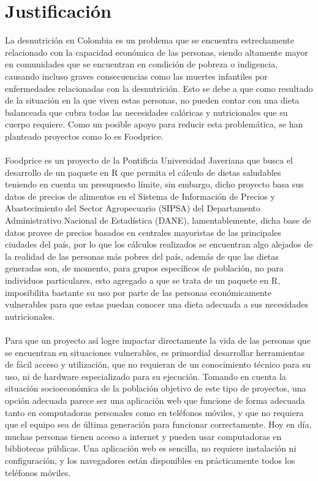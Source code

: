 \section{Justificaci\'on}
\noindent La desnutrici\'on en Colombia es un problema que se encuentra estrechamente relacionado con la capacidad econ\'omica de las personas, siendo altamente mayor en comunidades que se encuentran en condici\'on de pobreza o indigencia\cite{DesnutricionPobrezaVan}, causando incluso graves consecuencias como las muertes infantiles por enfermedades relacionadas con la desnutrici\'on\cite{restrepoMuertesPorDesnutricion2020}. Esto se debe a que como resultado de la situaci\'on en la que viven estas personas, no pueden contar con una dieta balanceada que cubra todas las necesidades cal\'oricas y nutricionales que su cuerpo requiere.
Como un posible apoyo para reducir esta problem\'atica, se han planteado proyectos como lo es Foodprice.
\\
\\
Foodprice es un proyecto de la Pontificia Universidad Javeriana que busca el desarrollo de un paquete en R que permita el c\'alculo de dietas saludables teniendo en cuenta un presupuesto l\'imite, sin embargo, dicho proyecto basa sus datos de precios de alimentos en el Sistema de Informaci\'on de Precios y Abastecimiento del Sector Agropecuario (SIPSA) del Departamento Administrativo Nacional de Estad\'istica (DANE), lamentablemente, dicha base de datos provee de precios basados en centrales mayoristas de las principales ciudades del pa\'is, por lo que los c\'alculos realizados se encuentran algo alejados de la realidad de las personas m\'as pobres del pa\'is, adem\'as de que las dietas generadas son, de momento, para grupos espec\'ificos de poblaci\'on, no para individuos particulares, esto agregado a que se trata de un paquete en R, imposibilita bastante su uso por parte de las personas econ\'omicamente vulnerables para que estas puedan conocer una dieta adecuada a sus necesidades nutricionales.
\\
\\
Para que un proyecto as\'i logre impactar directamente la vida de las personas que se encuentran en situaciones vulnerables, es primordial desarrollar herramientas de f\'acil acceso y utilizaci\'on, que no requieran de un conocimiento t\'ecnico para su uso, ni de hardware especializado para su ejecuci\'on. Tomando en cuenta la situaci\'on socioecon\'omica de la poblaci\'on objetivo de este tipo de proyectos, una opci\'on adecuada parece ser una aplicaci\'on web que funcione de forma adecuada tanto en computadoras personales como en tel\'efonos m\'oviles, y que no requiera que el equipo sea de \'ultima generaci\'on para funcionar correctamente. Hoy en d\'ia, muchas personas tienen acceso a internet y pueden usar computadoras en bibliotecas p\'ublicas. Una aplicaci\'on web es sencilla, no requiere instalaci\'on ni configuraci\'on, y los navegadores est\'an disponibles en pr\'acticamente todos los tel\'efonos m\'oviles.




